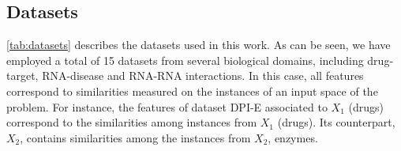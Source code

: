 \documentclass[sn-mathphys-num]{sn-jnl}%
\theoremstyle{thmstyleone}%
\theoremstyle{thmstyletwo}%
\theoremstyle{thmstylethree}%
\begin{document}




\subsection{Datasets}
\label{sec:datasets}

\autoref{tab:datasets} describes the datasets used in this work. As can be seen, we have employed a total of 15 datasets from several biological domains, including drug-target, RNA-disease and RNA-RNA interactions. In this case, all features correspond to similarities measured on the instances of an input space of the problem. For instance, the features of dataset DPI-E associated to $X_1$ (drugs) correspond to the similarities among instances from $X_1$ (drugs). Its counterpart, $X_2$, contains similarities among the instances from $X_2$, enzymes.
\end{document}
